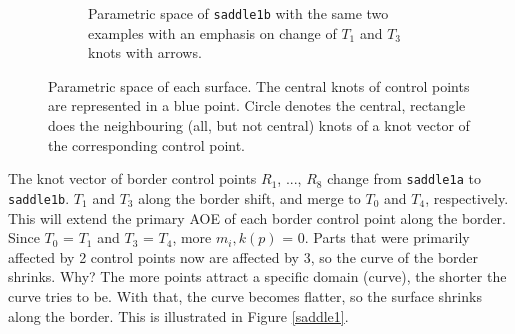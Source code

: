 \documentclass{article}
\begin{document}
\begin{figure}[H]
\begin{subfigure}[b]{0.48\textwidth}
\caption{Parametric space of \texttt{saddle1b} with the same two examples with an emphasis on change of $T_1$ and $T_3$ knots with arrows.}
\label{saddle1bp}
\end{subfigure}
\caption{Parametric space of each surface. The central knots of control points are represented in a blue point. Circle denotes the central, rectangle does the neighbouring (all, but not central) knots of a knot vector of the corresponding control point.}
\label{saddle1p}
\end{figure}

The knot vector of border control points $R_1$, ..., $R_8$ change from \texttt{saddle1a} to \texttt{saddle1b}. $T_1$ and $T_3$ along the border shift, and merge to $T_0$ and $T_4$, respectively. This will extend the primary AOE of each border control point along the border. Since $T_0$ = $T_1$ and $T_3$ = $T_4$, more $m_i,k(p)$ = 0. Parts that were primarily affected by 2 control points now are affected by 3, so the curve of the border shrinks. Why? The more points attract a specific domain (curve), the shorter the curve tries to be. With that, the curve becomes flatter, so the surface shrinks along the border. This is illustrated in Figure \ref{saddle1}.
\end{document}
